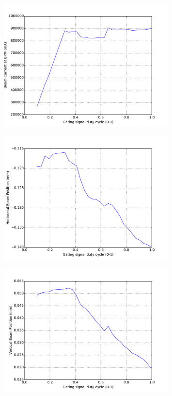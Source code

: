 \documentclass[a4paper, 11pt]{article}%
\begin{document}
%


\begin{figure}[htbp]%
\centering%
\includegraphics[width=0.8\textwidth]{./Results/scaled_DC_vs_current.pdf}%
\caption{}%
\end{figure}

%


\begin{figure}[htbp]%
\centering%
\includegraphics[width=0.8\textwidth]{./Results/scaled_DC_vs_X.pdf}%
\caption{}%
\end{figure}

%


\begin{figure}[htbp]%
\centering%
\includegraphics[width=0.8\textwidth]{./Results/scaled_DC_vs_Y.pdf}%
\caption{}%
\end{figure}
\end{document}
